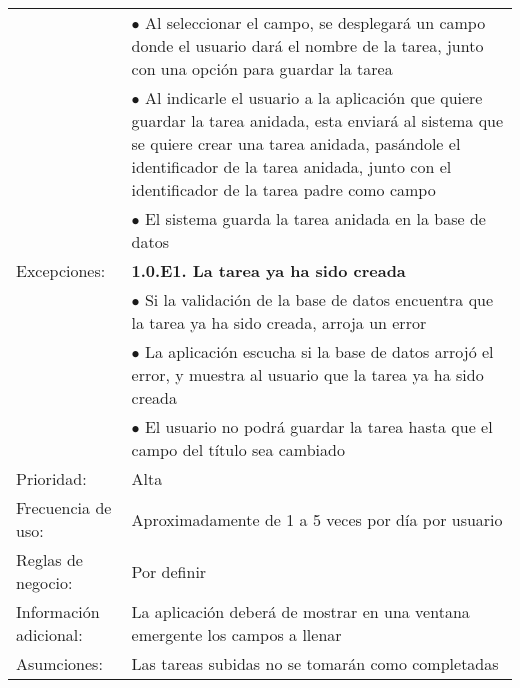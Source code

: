 \begin{longtable}[c]{p{3cm}p{5cm}p{4cm}p{2cm}}
		     & \multicolumn{3}{p{11cm}}{$\bullet$ Al seleccionar el campo, se desplegar\'a un campo donde el usuario dar\'a el nombre de la tarea, junto con una opci\'on para guardar la tarea}\\
		     & \multicolumn{3}{p{11cm}}{$\bullet$ Al indicarle el usuario a la aplicaci\'on que quiere guardar la tarea anidada, esta enviar\'a al sistema que se quiere crear una tarea anidada, pas\'andole el identificador de la tarea anidada, junto con el identificador de la tarea padre como campo}\\
		     & \multicolumn{3}{p{11cm}}{$\bullet$ El sistema guarda la tarea anidada en la base de datos}\\
  \hline
  Excepciones: & \multicolumn{3}{p{11cm}}{\textbf{1.0.E1. La tarea ya ha sido creada}}\\
	       & \multicolumn{3}{p{11cm}}{$\bullet$ Si la validaci\'on de la base de datos encuentra que la tarea ya ha sido creada, arroja un error}\\
	       & \multicolumn{3}{p{11cm}}{$\bullet$ La aplicaci\'on escucha si la base de datos arroj\'o el error, y muestra al usuario que la tarea ya ha sido creada}\\
	       & \multicolumn{3}{p{11cm}}{$\bullet$ El usuario no podr\'a guardar la tarea hasta que el campo del t\'itulo sea cambiado}\\
  \hline
  Prioridad: & \multicolumn{3}{p{11cm}}{Alta}\\
  \hline
  Frecuencia de uso: & \multicolumn{3}{p{11cm}}{Aproximadamente de 1 a 5 veces por d\'ia por usuario}\\
  \hline
  Reglas de negocio: & \multicolumn{3}{p{11cm}}{Por definir}\\
  \hline
  Informaci\'on adicional: & \multicolumn{3}{p{11cm}}{La aplicaci\'on deber\'a de mostrar en una ventana emergente los campos a llenar}\\
  \hline
  Asumciones: & \multicolumn{3}{p{11cm}}{Las tareas subidas no se tomar\'an como completadas}\\
  \hline
\end{longtable}
\vspace{1em}

